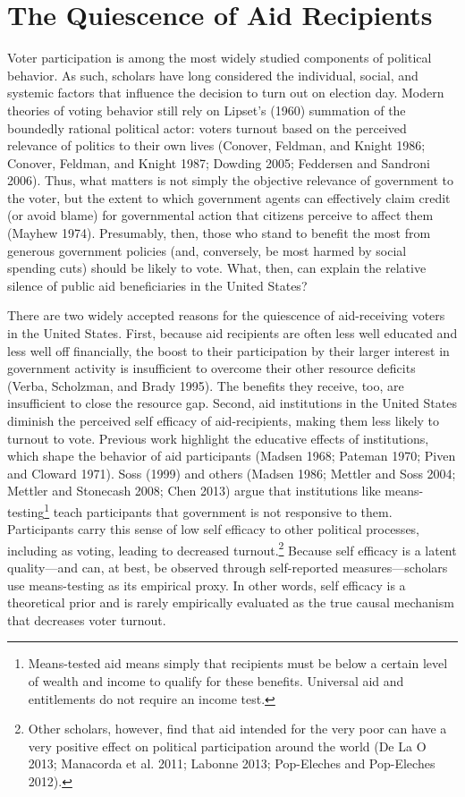 \documentclass[12pt]{paper}
\begin{document}
\section{The Quiescence of Aid Recipients}
Voter participation is among the most widely studied components of political behavior. As such, scholars have long considered the individual, social, and systemic factors that influence the decision to turn out on election day. Modern theories of voting behavior still rely on Lipset’s (1960) summation of the boundedly rational political actor: voters turnout based on the perceived relevance of politics to their own lives (Conover, Feldman, and Knight 1986; Conover, Feldman, and Knight 1987; Dowding 2005; Feddersen and Sandroni 2006). Thus, what matters is not simply the objective relevance of government to the voter, but the extent to which government agents can effectively claim credit (or avoid blame) for governmental action that citizens perceive to affect them (Mayhew 1974). Presumably, then, those who stand to benefit the most from generous government policies (and, conversely, be most harmed by social spending cuts) should be likely to vote. What, then, can explain the relative silence of public aid beneficiaries in the United States?

There are two widely accepted reasons for the quiescence of aid-receiving voters in the United States. First, because aid recipients are often less well educated and less well off financially, the boost to their participation by their larger interest in government activity is insufficient to overcome their other resource deficits (Verba, Scholzman, and Brady 1995). The benefits they receive, too, are insufficient to close the resource gap. Second, aid institutions in the United States diminish the perceived self efficacy of aid-recipients, making them less likely to turnout to vote. Previous work highlight the educative effects of institutions, which shape the behavior of aid participants (Madsen 1968; Pateman 1970; Piven and Cloward 1971). Soss (1999) and others (Madsen 1986; Mettler and Soss 2004; Mettler and Stonecash 2008; Chen 2013) argue that institutions like means-testing\footnote{Means-tested aid means simply that recipients must be below a certain level of wealth and income to qualify for these benefits. Universal aid and entitlements do not require an income test.} teach participants that government is not responsive to them. Participants carry this sense of low self efficacy to other political processes, including as voting, leading to decreased turnout.\footnote{Other scholars, however, find that aid intended for the very poor can have a very positive effect on political participation around the world (De La O 2013; Manacorda et al. 2011; Labonne 2013; Pop-Eleches and Pop-Eleches 2012).} Because self efficacy is a latent quality—and can, at best, be observed through self-reported measures—scholars use means-testing as its empirical proxy. In other words, self efficacy is a theoretical prior and is rarely empirically evaluated as the true causal mechanism that decreases voter turnout.
\end{document}
